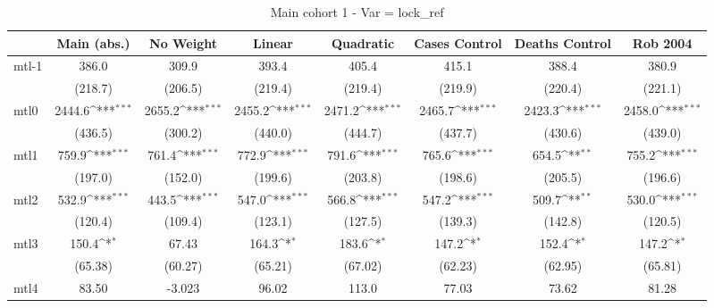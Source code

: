 \documentclass{article}
\begin{document}
{
\def\sym#1{\ifmmode^{#1}\else\(^{#1}\)\fi}
\begin{longtable}{l*{7}{c}}
\caption{Main cohort 1 - Var = lock\_ref}\\
\hline\hline\endfirsthead\hline\endhead\hline\endfoot\endlastfoot
                &\multicolumn{1}{c}{Main (abs.)}&\multicolumn{1}{c}{No Weight}&\multicolumn{1}{c}{Linear}&\multicolumn{1}{c}{Quadratic}&\multicolumn{1}{c}{Cases Control}&\multicolumn{1}{c}{Deaths Control}&\multicolumn{1}{c}{Rob 2004}\\
\hline
mtl-1           &    386.0         &    309.9         &    393.4         &    405.4         &    415.1         &    388.4         &    380.9         \\
                &  (218.7)         &  (206.5)         &  (219.4)         &  (219.4)         &  (219.9)         &  (220.4)         &  (221.1)         \\
mtl0            &   2444.6\sym{***}&   2655.2\sym{***}&   2455.2\sym{***}&   2471.2\sym{***}&   2465.7\sym{***}&   2423.3\sym{***}&   2458.0\sym{***}\\
                &  (436.5)         &  (300.2)         &  (440.0)         &  (444.7)         &  (437.7)         &  (430.6)         &  (439.0)         \\
mtl1            &    759.9\sym{***}&    761.4\sym{***}&    772.9\sym{***}&    791.6\sym{***}&    765.6\sym{***}&    654.5\sym{**} &    755.2\sym{***}\\
                &  (197.0)         &  (152.0)         &  (199.6)         &  (203.8)         &  (198.6)         &  (205.5)         &  (196.6)         \\
mtl2            &    532.9\sym{***}&    443.5\sym{***}&    547.0\sym{***}&    566.8\sym{***}&    547.2\sym{***}&    509.7\sym{**} &    530.0\sym{***}\\
                &  (120.4)         &  (109.4)         &  (123.1)         &  (127.5)         &  (139.3)         &  (142.8)         &  (120.5)         \\
mtl3            &    150.4\sym{*}  &    67.43         &    164.3\sym{*}  &    183.6\sym{*}  &    147.2\sym{*}  &    152.4\sym{*}  &    147.2\sym{*}  \\
                &  (65.38)         &  (60.27)         &  (65.21)         &  (67.02)         &  (62.23)         &  (62.95)         &  (65.81)         \\
mtl4            &    83.50         &   -3.023         &    96.02         &    113.0         &    77.03         &    73.62         &    81.28         \\

\end{longtable}}
\end{document}
